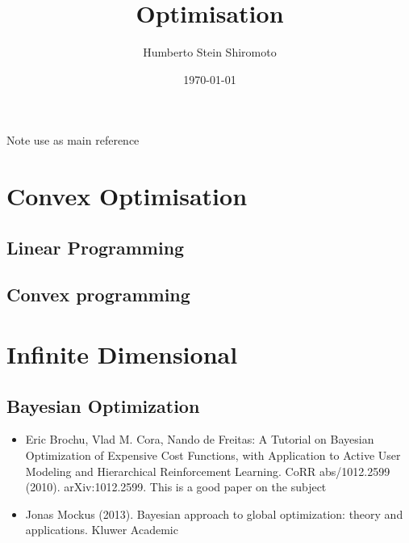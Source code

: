 \documentclass[sfsidenotes,notoc,nobib,a4paper]{tufte-book}
\title{Optimisation}
\author{Humberto Stein Shiromoto}
\date{\today}
\begin{document}
\setcounter{tocdepth}{1}
\maketitle




\tableofcontents
\adjustmtc
\printnomenclature

Note use \citep{Liberzon2012} as main reference

\part{Convex Optimisation}

\chapter{Linear Programming}

\chapter{Convex programming}

\part{Infinite Dimensional}



\chapter{Bayesian Optimization}

\begin{itemize}
	\item Eric Brochu, Vlad M. Cora, Nando de Freitas: A Tutorial on 
	Bayesian Optimization of Expensive Cost Functions, with Application
	 to Active User Modeling and Hierarchical Reinforcement Learning. 
	 CoRR abs/1012.2599 (2010). arXiv:1012.2599. This is a good paper on
	 the subject

	\item Jonas Mockus (2013). Bayesian approach to global optimization: 
	theory and applications. Kluwer Academic
\end{itemize}

\appendix
%



\printbibliography[heading=bibintoc]
\printindex
\end{document}
